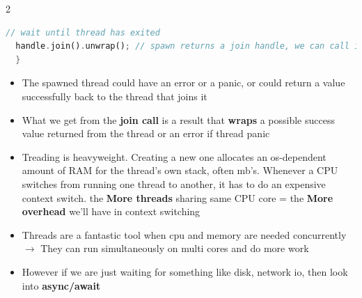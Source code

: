 \documentclass{report}
\begin{document}
\begin{multicols*}{2}
\begin{tcolorbox}[title=Fully functional example,colback=backcolour,size=small,left=4mm]
\begin{lstlisting}[language=rust]
  // wait until thread has exited
  handle.join().unwrap(); // spawn returns a join handle, we can call it, ant it'll pause the thread that we're joining has completed and exited
  }
\end{lstlisting}
\end{tcolorbox}

\begin{itemize}
  \item The spawned thread could have an error or a panic, or could return a value successfully back to the thread that joins it 
  \item What we get from the \textbf{join call} is a result that \textbf{wraps} a possible success value returned from the thread or an error if thread panic 
  \item Treading is heavyweight. Creating a new one allocates an os-dependent amount of RAM for the thread's own stack, often mb's. 
    Whenever a CPU switches from running one thread to another, it has to do an expensive context switch. the \textbf{More threads} sharing same CPU core = the \textbf{More overhead} we'll have in context switching 
    \item Threads are a fantastic tool when cpu and memory are needed concurrently $\rightarrow$ They can run simultaneously on multi cores and do more work 
    \item However if we are just waiting for something like disk, network io, then look into \textbf{async/await} 
\end{itemize}

\end{multicols*}
\end{document}
